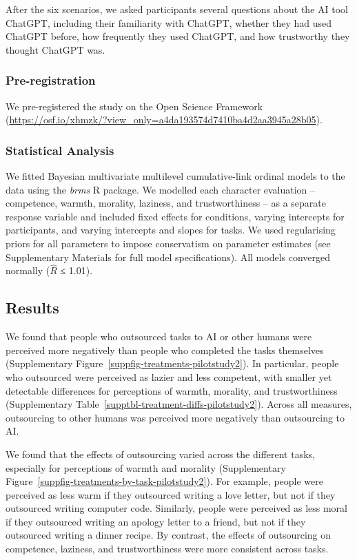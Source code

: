 \documentclass[
  man,
  floatsintext,
  longtable,
  nolmodern,
  notxfonts,
  notimes,
  colorlinks=true,linkcolor=blue,citecolor=blue,urlcolor=blue]{apa7}
\begin{document}
After the six scenarios, we asked participants several questions about
the AI tool ChatGPT, including their familiarity with ChatGPT, whether
they had used ChatGPT before, how frequently they used ChatGPT, and how
trustworthy they thought ChatGPT was.

\subsubsection*{Pre-registration}\label{pre-registration-5}

We pre-registered the study on the Open Science Framework
(\url{https://osf.io/xhmzk/?view_only=a4da193574d7410ba4d2aa3945a28b05}).

\subsubsection*{Statistical Analysis}\label{statistical-analysis-6}

We fitted Bayesian multivariate multilevel cumulative-link ordinal
models to the data using the \emph{brms} R package. We modelled each
character evaluation -- competence, warmth, morality, laziness, and
trustworthiness -- as a separate response variable and included fixed
effects for conditions, varying intercepts for participants, and varying
intercepts and slopes for tasks. We used regularising priors for all
parameters to impose conservatism on parameter estimates (see
Supplementary Materials for full model specifications). All models
converged normally (\(\hat{R}\) ≤ 1.01).

\subsection*{Results}\label{results-6}

We found that people who outsourced tasks to AI or other humans were
perceived more negatively than people who completed the tasks themselves
(Supplementary Figure~\ref{suppfig-treatments-pilotstudy2}). In
particular, people who outsourced were perceived as lazier and less
competent, with smaller yet detectable differences for perceptions of
warmth, morality, and trustworthiness
(Supplementary Table~\ref{supptbl-treatment-diffs-pilotstudy2}). Across
all measures, outsourcing to other humans was perceived more negatively
than outsourcing to AI.

We found that the effects of outsourcing varied across the different
tasks, especially for perceptions of warmth and morality
(Supplementary Figure~\ref{suppfig-treatments-by-task-pilotstudy2}). For
example, people were perceived as less warm if they outsourced writing a
love letter, but not if they outsourced writing computer code.
Similarly, people were perceived as less moral if they outsourced
writing an apology letter to a friend, but not if they outsourced
writing a dinner recipe. By contrast, the effects of outsourcing on
competence, laziness, and trustworthiness were more consistent across
tasks.
\end{document}
